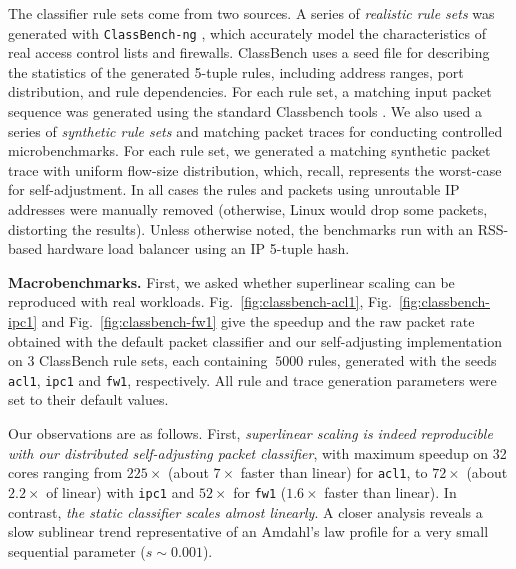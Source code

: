 The classifier rule sets come from two sources. A series of \emph{realistic rule sets} was generated with \texttt{ClassBench-ng} \cite{10.1109/ANCS.2017.33, 4237157}, which accurately model the characteristics of real access control lists and firewalls. ClassBench uses a seed file for describing the statistics of the generated 5-tuple rules, including address ranges, port distribution, and rule dependencies. %
For each rule set, a matching input packet sequence was generated using the standard Classbench tools \cite{10.1109/ANCS.2017.33,classbench-pcap}. We also used a series of \emph{synthetic rule sets} and matching packet traces for conducting controlled microbenchmarks. For each rule set, we generated a matching synthetic packet trace with uniform flow-size distribution, which, recall, represents the worst-case for self-adjustment.  In all cases the rules and packets using unroutable IP addresses were manually removed (otherwise, Linux would drop some packets, distorting the results). Unless otherwise noted, the benchmarks run with an RSS-based hardware load balancer using an IP 5-tuple hash.

\noindent
\textbf{Macrobenchmarks.} %
First, we asked whether superlinear scaling can be reproduced with real workloads. 
Fig.~\ref{fig:classbench-acl1}, Fig.~\ref{fig:classbench-ipc1} and Fig.~\ref{fig:classbench-fw1} give the speedup and the raw packet rate obtained with the default \nftables packet classifier and our self-adjusting implementation on 3 ClassBench rule sets, each containing $~5000$ rules, generated with the seeds \texttt{acl1}, \texttt{ipc1} and \texttt{fw1}, respectively. All rule and trace generation parameters were set to their default values. %

Our observations are as follows. First, \emph{superlinear scaling is indeed reproducible with our distributed self-adjusting packet classifier}, with maximum speedup on 32 cores ranging from $225\times$ (about $7\times$ faster than linear) for \texttt{acl1}, to $72\times$ (about $2.2\times$ of linear) with \texttt{ipc1} and $52\times$ for \texttt{fw1} ($1.6\times$ faster than linear). In contrast, \emph{the static \nftables classifier scales almost linearly}. A closer analysis reveals a slow sublinear trend representative of an Amdahl's law profile for a very small sequential parameter ($s\sim 0.001$).

